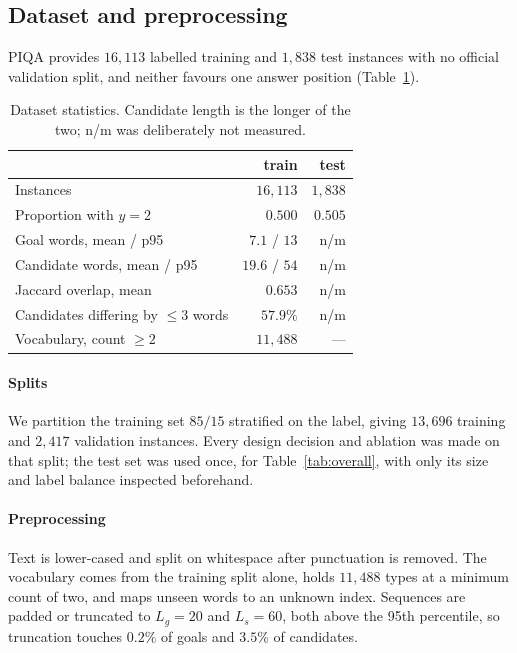 \documentclass[11pt]{article}
\begin{document}
\subsection{Dataset and preprocessing}
\label{sec:data}

PIQA provides $16{,}113$ labelled training and $1{,}838$ test instances with
no official validation split, and neither favours one answer position
(Table~\ref{tab:data}).

\begin{table}[tb]
  \centering\small
  \begin{tabular}{@{}lrr@{}}
    \toprule
     & \textbf{train} & \textbf{test}\\
    \midrule
    Instances & $16{,}113$ & $1{,}838$\\
    Proportion with $y = 2$ & $0.500$ & $0.505$\\
    Goal words, mean / p95 & $7.1$ / $13$ & n/m\\
    Candidate words, mean / p95 & $19.6$ / $54$ & n/m\\
    Jaccard overlap, mean & $0.653$ & n/m\\
    Candidates differing by $\leq 3$ words & $57.9\%$ & n/m\\
    Vocabulary, count $\geq 2$ & $11{,}488$ & ---\\
    \bottomrule
  \end{tabular}
  \caption{Dataset statistics. Candidate length is the longer of the two;
  n/m was deliberately not measured.}
  \label{tab:data}
\end{table}

\paragraph{Splits}
We partition the training set $85/15$ stratified on the label, giving
$13{,}696$ training and $2{,}417$ validation instances. Every design decision
and ablation was made on that split; the test set was used once, for
Table~\ref{tab:overall}, with only its size and label balance inspected
beforehand.

\paragraph{Preprocessing}
Text is lower-cased and split on whitespace after punctuation is removed. The
vocabulary comes from the training split alone, holds $11{,}488$ types at a
minimum count of two, and maps unseen words to an unknown index. Sequences are
padded or truncated to $L_g = 20$ and $L_s = 60$, both above the 95th
percentile, so truncation touches $0.2\%$ of goals and $3.5\%$ of
candidates.
\end{document}

